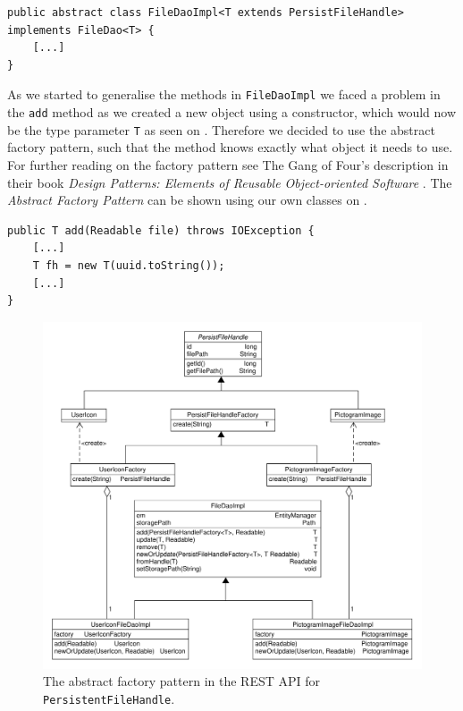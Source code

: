\begin{lstlisting}[float, floatplacement=h, caption={The \texttt{FileDaoImpl} class header which uses Type Parameters to generalise which types it can be used with.},label={lst:typeparameter}]
public abstract class FileDaoImpl<T extends PersistFileHandle> implements FileDao<T> {
    [...]
}
\end{lstlisting}

As we started to generalise the methods in \texttt{FileDaoImpl} we faced a problem in the \texttt{add} method as we created a new object using a constructor, which would now be the type parameter \texttt{T} as seen on .
Therefore we decided to use the abstract factory pattern, such that the method knows exactly what object it needs to use.
For further reading on the factory pattern see The Gang of Four's description in their book \textit{Design Patterns: Elements of Reusable Object-oriented Software} \cite{abstractfactorypattern}.
The \textit{Abstract Factory Pattern} can be shown using our own classes on .

\begin{lstlisting}[float, floatplacement=h, caption={Trying to use a Type Parameter constructor, which Java cannot do.},label={lst:TypeParameterConstructor}]
public T add(Readable file) throws IOException {
    [...]
    T fh = new T(uuid.toString());
    [...]
}
\end{lstlisting}

\begin{figure}[h]
    \centering
    \includegraphics[width=\textwidth]{figures/factorymodel.pdf}
    \caption{The abstract factory pattern in the REST API for \texttt{PersistentFileHandle}.}\label{fig:asbtractFactory}
\end{figure}

